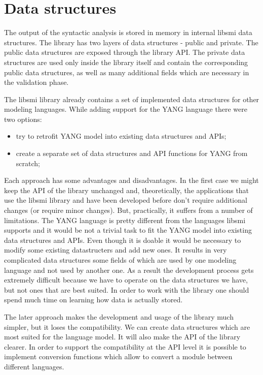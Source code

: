 \documentclass[conference]{IEEEtran}
\begin{document}
\section{Data structures}
The output of the syntactic analysis is stored in memory in internal libsmi data structures. The library has two layers of data structures - public and private. The public data structures are exposed through the library API. The private data structures are used only inside the library itself and contain the corresponding public data structures, as well as many additional fields which are necessary in the validation phase. 

The libsmi library already contains a set of implemented data structures for other modeling languages. While adding support for the YANG language there were two options:
\begin{itemize}
\item try to retrofit YANG model into existing data structures and APIs;
\item create a separate set of data structures and API functions for YANG from scratch;
\end{itemize}

Each approach has some advantages and disadvantages. In the first case we might keep the API of the library unchanged and, theoretically, the applications that use the libsmi library and have been developed before don't require additional changes (or require minor changes). But, practically, it suffers from a number of limitations. The YANG language is pretty different from the languages libsmi supports and it would be not a trivial task to fit the YANG model into existing data structures and APIs. Even though it is doable it would be necessary to modify some existing datastructers and add new ones. It results in very complicated data structures some fields of which are used by one modeling language and not used by another one. As a result the development process gets extremely difficult because we have to operate on the data structures we have, but not ones that are best suited. In order to work with the library one should spend much time on learning how  data is actually stored. 

The later approach makes the development and usage of the library much simpler, but it loses the compatibility. We can create data structures which are most suited for the language model. It will also make the API of the library clearer. In order to support the compatibility at the API level it is possible to implement conversion functions which allow to convert a module between different languages. 
\end{document}

